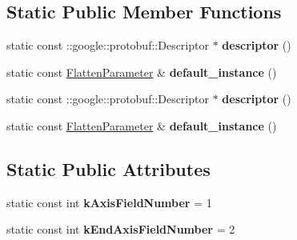 \subsection*{Static Public Member Functions}
\begin{DoxyCompactItemize}
\item 
\mbox{\label{classcaffe_1_1_flatten_parameter_a565fa4704182982e0297dee8eb68f0ba}} 
static const \+::google\+::protobuf\+::\+Descriptor $\ast$ {\bfseries descriptor} ()
\item 
\mbox{\label{classcaffe_1_1_flatten_parameter_a6e8956e742d21a12cf2fa063af3aecf2}} 
static const \mbox{\hyperlink{classcaffe_1_1_flatten_parameter}{Flatten\+Parameter}} \& {\bfseries default\+\_\+instance} ()
\item 
\mbox{\label{classcaffe_1_1_flatten_parameter_a06997538e19886a757ad903c0d5cbf94}} 
static const \+::google\+::protobuf\+::\+Descriptor $\ast$ {\bfseries descriptor} ()
\item 
\mbox{\label{classcaffe_1_1_flatten_parameter_a2c0f61b8df91b0a80b8f5a80f215e23b}} 
static const \mbox{\hyperlink{classcaffe_1_1_flatten_parameter}{Flatten\+Parameter}} \& {\bfseries default\+\_\+instance} ()
\end{DoxyCompactItemize}
\subsection*{Static Public Attributes}
\begin{DoxyCompactItemize}
\item 
\mbox{\label{classcaffe_1_1_flatten_parameter_a48de530999a909f9cd04484fd2acf225}} 
static const int {\bfseries k\+Axis\+Field\+Number} = 1
\item 
\mbox{\label{classcaffe_1_1_flatten_parameter_a94d55d3b298d3762a5c6c49bedee24e0}} 
static const int {\bfseries k\+End\+Axis\+Field\+Number} = 2
\end{DoxyCompactItemize}

